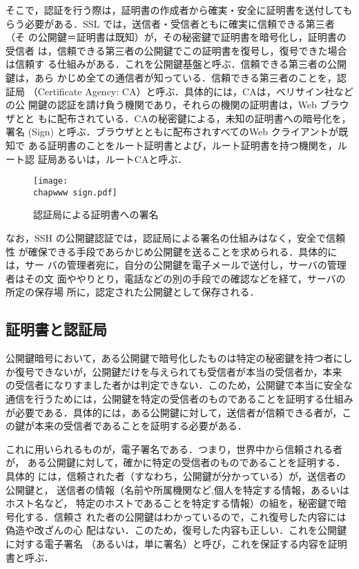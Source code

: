 そこで，認証を行う際は，証明書の作成者から確実・安全に証明書を送付しても
らう必要がある．SSL では，送信者・受信者ともに確実に信頼できる第三者（そ
の公開鍵＝証明書は既知）が，その秘密鍵で証明書を暗号化し，証明書の受信者
は，信頼できる第三者の公開鍵でこの証明書を復号し，復号できた場合は信頼す
る仕組みがある．これを公開鍵基盤と呼ぶ．信頼できる第三者の公開鍵は，あら
かじめ全ての通信者が知っている．信頼できる第三者のことを，認証局
（Certificate Agency: CA）と呼ぶ．具体的には，CAは，ベリサイン社などの公
開鍵の認証を請け負う機関であり，それらの機関の証明書は，Web ブラウザとと
もに配布されている．CAの秘密鍵による，未知の証明書への暗号化を，署名 
(Sign) と呼ぶ．ブラウザとともに配布されすべてのWeb クライアントが既知で
ある証明書のことをルート証明書とよび，ルート証明書を持つ機関を，ルート認
証局あるいは，ルートCAと呼ぶ．

\begin{figure}[ht]
 \begin{center}
  \texttt{[image: \\chapwww sign.pdf]}
  \label{fig:04:sign}
  \caption{認証局による証明書への署名}
 \end{center}
\end{figure}

なお，SSH の公開鍵認証では，認証局による署名の仕組みはなく，安全で信頼性
が確保できる手段であらかじめ公開鍵を送ることを求められる．具体的には，サー
バの管理者宛に，自分の公開鍵を電子メールで送付し，サーバの管理者はその文
面ややりとり，電話などの別の手段での確認などを経て，サーバの所定の保存場
所に，認定された公開鍵として保存される．

\subsection{証明書と認証局}

公開鍵暗号において，ある公開鍵で暗号化したものは特定の秘密鍵を持つ者にし
か復号できないが，公開鍵だけを与えられても受信者が本当の受信者か，本来
の受信者になりすました者かは判定できない．このため，公開鍵で本当に安全な
通信を行うためには，公開鍵を特定の受信者のものであることを証明する仕組み
が必要である．具体的には，ある公開鍵に対して，送信者が信頼できる者が，こ
の鍵が本来の受信者であることを証明する必要がある．

これに用いられるものが，電子署名である．つまり，世界中から信頼される者が，
ある公開鍵に対して，確かに特定の受信者のものであることを証明する．具体的
には，信頼された者（すなわち，公開鍵が分かっている）が，送信者の公開鍵と，
送信者の情報（名前や所属機関など,個人を特定する情報，あるいはホスト名など，
特定のホストであることを特定する情報）の組を，秘密鍵で暗号化する．信頼さ
れた者の公開鍵はわかっているので，これ復号した内容には偽造や改ざんの心
配はない．このため，復号した内容も正しい．これを公開鍵に対する電子署名
（あるいは，単に署名）と呼び，これを保証する内容を証明書と呼ぶ．

